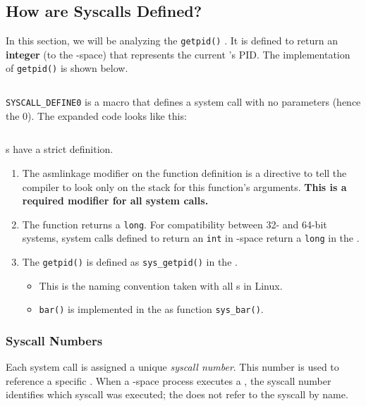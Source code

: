 \subsection{How are Syscalls Defined?}\label{subsec:How_Syscalls_Defined}
In this section, we will be analyzing the \texttt{getpid()} .
It is defined to return an \textbf{integer} (to the -space) that represents the current 's PID.\@
The implementation of \texttt{getpid()} is shown below.
\inputminted[frame=lines,linenos]{c}{./EDAF35-Operating_Systems-Sections/System_Calls/Code/getpid_Implementation.c}

\texttt{SYSCALL_DEFINE0} is a macro that defines a system call with no parameters (hence the 0).
The expanded code looks like this:
\inputminted[frame=lines,linenos]{c}{./EDAF35-Operating_Systems-Sections/System_Calls/Code/getpid_Expanded.c}

s have a strict definition.
\begin{enumerate}[noitemsep]
\item The asmlinkage modifier on the function definition is a directive to tell the compiler to look only on the stack for this function’s arguments.
  \textbf{This is a required modifier for all system calls.}
\item The function returns a \texttt{long}.
  For compatibility between 32- and 64-bit systems, system calls defined to return an \texttt{int} in -space return a \texttt{long} in the .
\item The \texttt{getpid()}  is defined as \texttt{sys_getpid()} in the .
  \begin{itemize}[noitemsep]
  \item This is the naming convention taken with all s in Linux.
  \item {} \texttt{bar()} is implemented in the  as function \texttt{sys_bar()}.
  \end{itemize}
\end{enumerate}

\subsubsection{Syscall Numbers}\label{subsubsec:Syscall_Numbers}
\begin{definition}\label{def:Syscall_Number}
  Each system call is assigned a unique \emph{syscall number}.
  This number is used to reference a specific .
  When a -space process executes a , the syscall number identifies which syscall was executed; the  does not refer to the syscall by name.
\end{definition}

